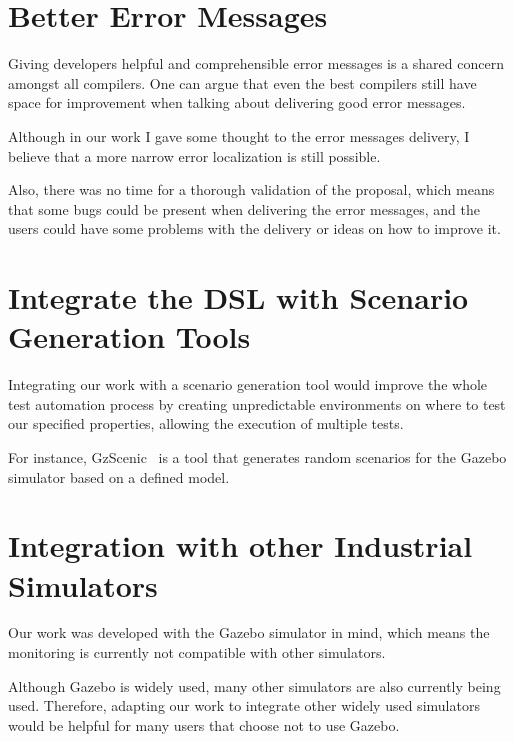 \section{Better Error Messages}
\label{sec:bettererrormsg}

Giving developers helpful and comprehensible error messages is a shared concern amongst all compilers. One can argue that even the best compilers still have space for improvement when talking about delivering good error messages.

Although in our work I gave some thought to the error messages delivery, I believe that a more narrow error localization is still possible.

Also, there was no time for a thorough validation of the proposal, which means that some bugs could be present when delivering the error messages, and the users could have some problems with the delivery or ideas on how to improve it.


\section{Integrate the DSL with Scenario Generation Tools}
\label{sec:integratescenario}

Integrating our work with a scenario generation tool would improve the whole test automation process by creating unpredictable environments on where to test our specified properties, allowing the execution of multiple tests.

For instance, GzScenic~\cite{AfzalGzScenic} is a tool that generates random scenarios for the Gazebo simulator based on a defined model.


\section{Integration with other Industrial Simulators}
\label{sec:integratesimulators}

Our work was developed with the Gazebo simulator in mind, which means the monitoring is currently not compatible with other simulators.

Although Gazebo is widely used, many other simulators are also currently being used. Therefore, adapting our work to integrate other widely used simulators would be helpful for many users that choose not to use Gazebo.





